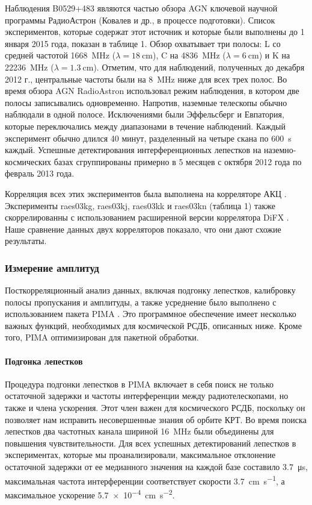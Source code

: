 Наблюдения B0529+483 являются частью обзора AGN ключевой научной программы РадиоАстрон (Ковалев и
др., в процессе подготовки). Список экспериментов, которые содержат этот источник и которые были
выполнены до 1 января 2015 года, показан в таблице 1. Обзор охватывает три полосы: L со средней
частотой \SI{1668}{\MHz} ($\lambda = \SI{18}{\cm}$), C на \SI{4836}{\MHz} ($\lambda = \SI{6}{\cm}$)
и K на \SI{22236}{\MHz} ($\lambda = \SI{1.3}{\cm}$). Отметим, что для наблюдений, полученных до
декабря 2012 г., центральные частоты были на \SI{8}{\MHz} ниже для всех трех полос. Во время обзора
AGN RadioAstron использовал режим наблюдения, в котором две полосы записывались одновременно.
Напротив, наземные телескопы обычно наблюдали в одной полосе. Исключениями были Эффельсберг и
Евпатория, которые переключались между диапазонами в течение наблюдений. Каждый эксперимент обычно
длился 40 минут, разделенный на четыре скана по \SI{600}{\second} каждый. Успешные детектирования
интерференционных лепестков  на наземно-космических базах сгруппированы примерно в 5 месяцев с
октября 2012 года по февраль 2013 года.

Корреляция всех этих экспериментов была выполнена на корреляторе АКЦ \cite{Likhachev_2017}.
Эксперименты raes03kg, raes03kj, raes03kk и raes03kn (таблица 1) также скоррелированны с
использованием расширенной версии \cite{Bruni_2016} коррелятора DiFX \cite{Deller_2011}. Наше
сравнение данных двух корреляторов показало, что они дают схожие результаты.

\subsubsection{Измерение амплитуд}

Посткорреляционный анализ данных, включая подгонку лепестков, калибровку полосы пропускания
и амплитуды, а также усреднение было выполнено с использованием пакета PIMA \cite{Petrov_2011}. Это
программное обеспечение имеет несколько важных функций, необходимых для космической РСДБ, описанных
ниже. Кроме того, PIMA оптимизирован для пакетной обработки.

\paragraph{Подгонка лепестков}

Процедура подгонки лепестков в PIMA включает в себя поиск не только остаточной задержки и частоты
интерференции между радиотелескопами, но также и члена ускорения. Этот член важен для
космического РСДБ, поскольку он позволяет нам исправить несовершенные знания об орбите КРТ. Во время
поиска лепестков два частотных канала шириной \SI{16}{\MHz} были объединены для повышения
чувствительности. Для всех успешных детектирований лепестков в экспериментах, которые мы
проанализировали, максимальное отклонение остаточной задержки от ее медианного значения на каждой
базе составило \SI{3.7}{\us}, максимальная частота интерференции соответствует скорости
\SI{3.7}{\cm\per\second}, а максимальное ускорение \SI{5.7e-4}{\cm\per\second^2}.

